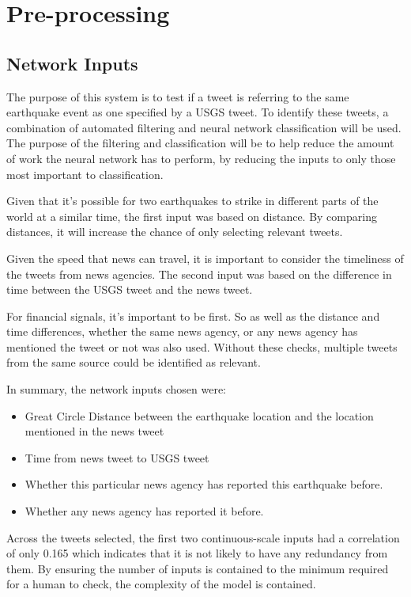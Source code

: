 \pagebreak
\section{Pre-processing}

\subsection{Network Inputs}

The purpose of this system is to test if a tweet is referring to the same earthquake event as one specified by a USGS tweet. To identify these tweets, a combination of automated filtering and neural network classification will be used. The purpose of the filtering and classification will be to help reduce the amount of work the neural network has to perform, by reducing the inputs to only those most important to classification.

Given that it's possible for two earthquakes to strike in different parts of the world at a similar time, the first input was based on distance. By comparing distances, it will increase the chance of only selecting relevant tweets.

Given the speed that news can travel, it is important to consider the timeliness of the tweets from news agencies. The second input was based on the difference in time between the USGS tweet and the news tweet.

For financial signals, it's important to be first. So as well as the distance and time differences, whether the same news agency, or any news agency has mentioned the tweet or not was also used. Without these checks, multiple tweets from the same source could be identified as relevant.

In summary, the network inputs chosen were:
\begin{itemize}
    \item Great Circle Distance between the earthquake location and the location mentioned in the news tweet
    \item Time from news tweet to USGS tweet
    \item Whether this particular news agency has reported this earthquake before.
    \item Whether any news agency has reported it before.
\end{itemize}

Across the tweets selected, the first two continuous-scale inputs had a correlation of only 0.165 which indicates that it is not likely to have any redundancy from them. By ensuring the number of inputs is contained to the minimum required for a human to check, the complexity of the model is contained.

